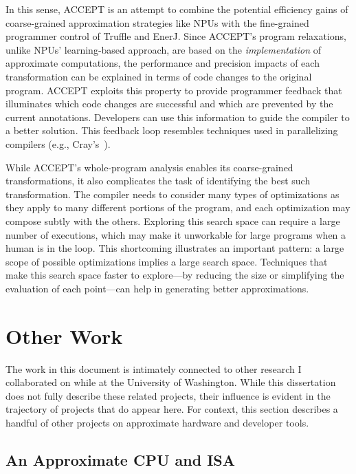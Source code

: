 In this sense, ACCEPT is an attempt to combine the potential efficiency gains
of coarse-grained approximation strategies like NPUs with the fine-grained
programmer control of Truffle and EnerJ. Since ACCEPT's program relaxations,
unlike NPUs' learning-based approach, are based on the \emph{implementation}
of approximate computations, the performance and precision impacts of each
transformation can be explained in terms of code changes to the original
program. ACCEPT exploits this property to provide programmer feedback that
illuminates which code changes are successful and which are prevented by the
current annotations. Developers can use this information to guide the compiler
to a better solution. This feedback loop resembles techniques used in
parallelizing compilers (e.g., Cray's~\cite{canal}).

While ACCEPT's whole-program analysis enables its coarse-grained
transformations, it also complicates the task of identifying the best such
transformation. The compiler needs to consider many types of optimizations as
they apply to many different portions of the program, and each optimization
may compose subtly with the others. Exploring this search space can require
a large number of executions, which may make it unworkable for large programs
when a human is in the loop. This shortcoming illustrates an important
pattern: a large scope of possible optimizations implies a large search space.
Techniques that make this search space faster to explore---by reducing the
size or simplifying the evaluation of each point---can help in generating
better approximations.



\section{Other Work}

The work in this document is intimately connected to other research I
collaborated on while at the University of Washington.
While this dissertation does not fully describe these related projects, their
influence is evident in the trajectory of projects that do appear here.
For context, this section describes a handful of other projects on approximate
hardware and developer tools.

\subsection{An Approximate CPU and ISA}

\cite{truffle}

